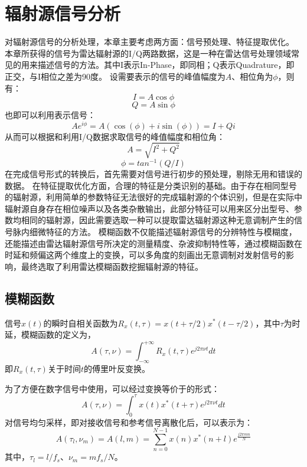 \section{辐射源信号分析}
\label{sec:sei_data}
对辐射源信号的分析处理，本章主要考虑两方面：信号预处理、特征提取优化。
本章所获得的信号为雷达辐射源的I/Q两路数据，这是一种在雷达信号处理领域常见的用来描述信号的方法。其中I表示In-Phase，即同相；Q表示Quadrature，即正交，与I相位之差为90度。
设需要表示的信号的峰值幅度为$A$、相位角为$\phi$，则有：
\begin{equation}
	I = A\cos{\phi}
	\label{equ:i}
\end{equation}
\begin{equation}
	Q = A\sin{\phi}
	\label{equ:q}
\end{equation}
也即可以利用表示信号：
\begin{equation}
	Ae^{i\phi}=A(\cos(\phi) + i\sin(\phi))=I+Qi
	\label{equ:signal}
\end{equation}
从而可以根据和利用I/Q数据求取信号的峰值幅度和相位角：
\begin{equation}
	A=\sqrt{I^2+Q^2}
\end{equation}
\begin{equation}
	\phi=tan^{-1}(Q/I)
\end{equation}
在完成信号形式的转换后，首先需要对信号进行初步的预处理，剔除无用和错误的数据。
在特征提取优化方面，合理的特征是分类识别的基础。由于存在相同型号的辐射源，利用简单的参数特征无法很好的完成辐射源的个体识别，但是在实际中辐射源自身存在相位噪声以及各类杂散输出，此部分特征可以用来区分出型号、参数均相同的辐射源，因此需要选取一种可以提取雷达辐射源这种无意调制产生的信号脉内细微特征的方法。
模糊函数不仅能描述辐射源信号的分辨特性与模糊度，还能描述由雷达辐射源信号所决定的测量精度、杂波抑制特性等，通过模糊函数在时延和频偏这两个维度上的变换，可以多角度的刻画出无意调制对发射信号的影响，最终选取了利用雷达模糊函数挖掘辐射源的特征。
\subsection{模糊函数}
信号$x(t)$的瞬时自相关函数为$R_x(t,\tau)=x(t+\tau/2)x^{*}(t-\tau/2)$，其中$\tau$为时延，模糊函数的定义为，
\begin{equation}
A(\tau,\nu) = \int_{-\infty}^{+\infty}R_x(t,\tau)e^{j2\pi\nu t}dt
\label{equ:defineaf}
\end{equation}
即$R_x(t,\tau)$关于时间$t$的傅里叶反变换。

为了方便在数字信号中使用，可以经过变换等价于的形式：
\begin{equation}
A(\tau,\nu) = \int_{0}^{\tau}x(t)x^{*}(t+\tau)e^{j2\pi\nu t}dt
\label{equ:afcon}
\end{equation}
对信号均匀采样，即对接收信号和参考信号离散化后，可以表示为：
\begin{equation}
A(\tau_l,\nu_m) = A(l, m) = \sum_{n = 0}^{N-1}x(n)x^{*}(n+l)e^{\frac{j2\pi m n}{N}}
\end{equation}
其中，$\tau_l=l/f_s$、$\nu_m=mf_s/N$。

